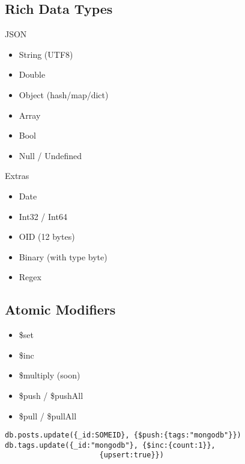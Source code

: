 \documentclass{beamer}
\begin{document}
\subsection{Rich Data Types}
\begin{frame}[fragile]
  \begin{block}{JSON}
  \begin{itemize}
    \item String (UTF8)
    \item Double
    \item Object (hash/map/dict)
    \item Array
    \item Bool
    \item Null / Undefined
  \end{itemize}
  \end{block}

  \begin{block}{Extras}
  \begin{itemize}
    \item Date
    \item Int32 / Int64
    \item OID (12 bytes)
    \item Binary (with type byte)
    \item Regex
  \end{itemize}
  \end{block}
\end{frame}

  
\subsection{Atomic Modifiers}
\begin{frame}[fragile]
  \begin{itemize}
    \item \$set
    \item \$inc
    \item \$multiply (soon)
    \item \$push / \$pushAll
    \item \$pull / \$pullAll
  \end{itemize}


    \begin{small}
    \begin{verbatim}
db.posts.update({_id:SOMEID}, {$push:{tags:"mongodb"}})
db.tags.update({_id:"mongodb"}, {$inc:{count:1}},
                      {upsert:true}})
    \end{verbatim}
    \end{small}
\end{frame}
\end{document}
